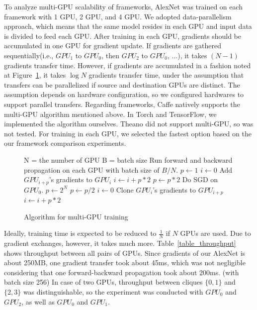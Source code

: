 To analyze multi-GPU scalability of frameworks, AlexNet was trained on each framework with 1 GPU, 2 GPU, and 4 GPU.
We adopted data-parallelism approach, which means that the same model resides in each GPU and input data is divided to feed each GPU.
After training in each GPU, gradients should be accumulated in one GPU for gradient update.
If gradients are gathered sequentially(i.e., $GPU_1$ to $GPU_0$, then $GPU_2$ to $GPU_0$, ...), it takes $(N-1)$ gradients transfer time.
However, if gradients are accumulated in a fashion noted at Figure~\ref{fig_multigpu_algorithm}, it takes $\log N$ gradients transfer time, under the assumption that transfers can be parallelized if source and destination GPUs are distinct.
The assumption depends on hardware configuration, so we configured hardwares to support parallel transfers.
Regarding frameworks, Caffe natively supports the multi-GPU algorithm mentioned above.
In Torch and TensorFlow, we implemented the algorithm ourselves.
Theano did not support multi-GPU, so was not tested.
For training in each GPU, we selected the fastest option based on the our framework comparison experiments.

\begin{figure}
\begin{algorithmic}[1]
  \REQUIRE N = the number of GPU
  \REQUIRE B = batch size
  \STATE Run forward and backward propagation on each GPU with batch size of $B/N$.
  \STATE $p\gets 1$
    \STATE $i\gets 0$
      \STATE Add $GPU_{i+p}$'s gradients to $GPU_{i}$
      \STATE $i\gets i+p*2$
    \ENDWHILE
    \STATE $p\gets p*2$
  \ENDWHILE
  \STATE Do SGD on $GPU_{0}$.
  \STATE $p\gets 2^{N}$
    \STATE $p\gets p/2$
    \STATE $i\gets 0$
      \STATE Clone $GPU_{i}$'s gradients to $GPU_{i+p}$
      \STATE $i\gets i+p*2$
    \ENDWHILE
  \ENDWHILE
\end{algorithmic}
  \caption{Algorithm for multi-GPU training}
  \label{fig_multigpu_algorithm}
\end{figure}

Ideally, training time is expected to be reduced to $\frac{1}{N}$ if $N$ GPUs are used.
Due to gradient exchanges, however, it takes much more.
Table~\ref{table_throughput} shows throughput between all pairs of GPUs.
Since gradients of our AlexNet is about 250MB, one gradient transfer took about 45ms, which was not negligible considering that one forward-backward propagation took about 200ms. (with batch size 256)
In case of two GPUs, throughput between cliques $\{0, 1\}$ and $\{2, 3\}$ was distinguishable, so the experiment was conducted with $GPU_0$ and $GPU_2$, as well as $GPU_0$ and $GPU_1$.

